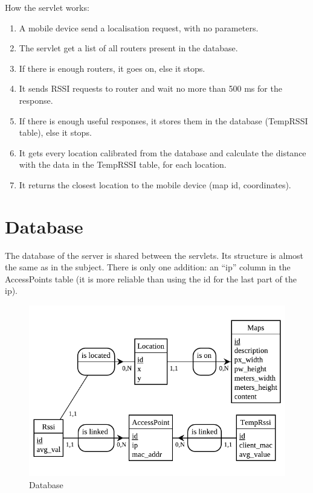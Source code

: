 How the servlet works:
\begin{enumerate}
    \item A mobile device send a localisation request, with no parameters.
    \item The servlet get a list of all routers present in the database.
    \item If there is enough routers, it goes on, else it stops.
    \item It sends RSSI requests to router and wait no more than 500 ms for the
        response.
    \item If there is enough useful responses, it stores them in the database
        (TempRSSI table), else it stops.
    \item It gets every location calibrated from the database and calculate the
        distance with the data in the TempRSSI table, for each location.
    \item It returns the closest location to the mobile device (map id,
        coordinates).
\end{enumerate}


    \section{Database}

The database of the server is shared between the servlets. Its structure is
almost the same as in the subject. There is only one addition: an ``ip'' column
in the AccessPoints table (it is more reliable than using the id for the last
part of the ip).

\begin{figure}[h]
  \centering
  \includegraphics[scale=1]{./positioning_server/db.pdf}
  \caption{Database}
\end{figure}

